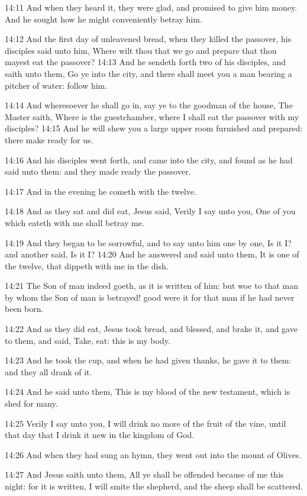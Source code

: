 14:11 And when they heard it, they were glad, and promised to give him
money. And he sought how he might conveniently betray him.

14:12 And the first day of unleavened bread, when they killed the
passover, his disciples said unto him, Where wilt thou that we go and
prepare that thou mayest eat the passover?  14:13 And he sendeth forth
two of his disciples, and saith unto them, Go ye into the city, and
there shall meet you a man bearing a pitcher of water: follow him.

14:14 And wheresoever he shall go in, say ye to the goodman of the
house, The Master saith, Where is the guestchamber, where I shall eat
the passover with my disciples?  14:15 And he will shew you a large
upper room furnished and prepared: there make ready for us.

14:16 And his disciples went forth, and came into the city, and found
as he had said unto them: and they made ready the passover.

14:17 And in the evening he cometh with the twelve.

14:18 And as they sat and did eat, Jesus said, Verily I say unto you,
One of you which eateth with me shall betray me.

14:19 And they began to be sorrowful, and to say unto him one by one,
Is it I? and another said, Is it I?  14:20 And he answered and said
unto them, It is one of the twelve, that dippeth with me in the dish.

14:21 The Son of man indeed goeth, as it is written of him: but woe to
that man by whom the Son of man is betrayed! good were it for that man
if he had never been born.

14:22 And as they did eat, Jesus took bread, and blessed, and brake
it, and gave to them, and said, Take, eat: this is my body.

14:23 And he took the cup, and when he had given thanks, he gave it to
them: and they all drank of it.

14:24 And he said unto them, This is my blood of the new testament,
which is shed for many.

14:25 Verily I say unto you, I will drink no more of the fruit of the
vine, until that day that I drink it new in the kingdom of God.

14:26 And when they had sung an hymn, they went out into the mount of
Olives.

14:27 And Jesus saith unto them, All ye shall be offended because of
me this night: for it is written, I will smite the shepherd, and the
sheep shall be scattered.

